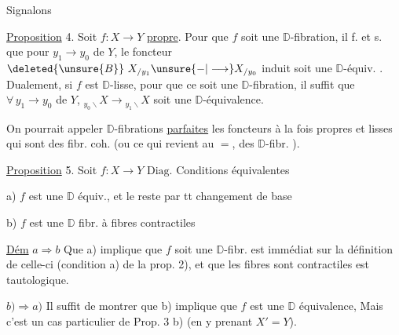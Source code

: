 
 Signalons

\uline{Proposition} 4. Soit $f:X\longrightarrow Y$ \uline{propre}. Pour que $f$ soit une $\mathbb D$-fibration, il f. et s. que pour  $y_1\longrightarrow y_0$ de $Y$, le foncteur $\deleted{\unsure{B}}\ X_{/y_1}\unsure{-|\longrightarrow}X_{/y_0}$ induit soit une $\mathbb D$-équiv. . Dualement, si $f$ est $\mathbb D$-lisse, pour que ce soit une $\mathbb D$-fibration, il  suffit que $\forall\, y_1\longrightarrow y_0$ de $Y$, $ {}_{y_0\backslash}X\longrightarrow {}_{y_1\backslash}X$ soit une $\mathbb D$-équivalence.


On pourrait appeler $\mathbb D$-fibrations \uline{parfaites} les foncteurs à la fois propres et lisses qui sont des fibr. coh. (ou ce qui revient au $=$, des $\mathbb D$-fibr. ).

 \uline{Proposition} 5. Soit $f:X\longrightarrow Y$  $\mathrm{Diag}$. Conditions équivalentes

a) \deleted{\unsure{$\forall$}} $f$ est une $\mathbb D$ équiv., et le reste par tt changement de base

b) $f$ est une $\mathbb D$ fibr. à fibres contractiles

\uline{Dém} $a\Longrightarrow b$ Que  a) implique que $f$ soit une $\mathbb D$-fibr. est immédiat sur la définition de celle-ci (condition a) de la prop. 2), et que les fibres sont contractiles est tautologique.

$b)\Longrightarrow a)$ Il suffit de montrer que b) implique que $f$ est une $\mathbb D$ équivalence, Mais c'est un cas particulier de Prop. 3 b) (en y prenant $X'=Y$).
